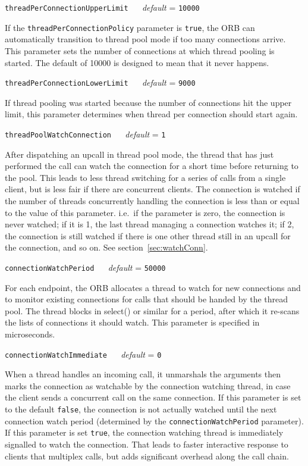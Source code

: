 \documentclass[11pt,twoside,a4paper]{book}
\makeatletter
\newcommand{\code}[1]{\texttt{#1}}
\newcommand{\confopt}[2]
  {\vspace{\baselineskip}\par\noindent\code{#1} ~~ \textit{default} =
   \code{#2}}
\renewcommand{\confopt}[2]
  {\vspace{\baselineskip}\par\noindent\code{#1} ~~ \textit{default} =
   \code{#2}\\[-1ex]\@afterheading}
\makeatother
\begin{document}
\confopt{threadPerConnectionUpperLimit}{10000}

If the \code{threadPerConnectionPolicy} parameter is \code{true}, the
ORB can automatically transition to thread pool mode if too many
connections arrive. This parameter sets the number of connections at
which thread pooling is started. The default of 10000 is designed to
mean that it never happens.


\confopt{threadPerConnectionLowerLimit}{9000}

If thread pooling was started because the number of connections hit
the upper limit, this parameter determines when thread per connection
should start again.


\confopt{threadPoolWatchConnection}{1}

After dispatching an upcall in thread pool mode, the thread that has
just performed the call can watch the connection for a short time
before returning to the pool. This leads to less thread switching for
a series of calls from a single client, but is less fair if there are
concurrent clients. The connection is watched if the number of threads
concurrently handling the connection is less than or equal to the
value of this parameter. i.e.\ if the parameter is zero, the
connection is never watched; if it is 1, the last thread managing a
connection watches it; if 2, the connection is still watched if there
is one other thread still in an upcall for the connection, and so
on. See section~\ref{sec:watchConn}.


\confopt{connectionWatchPeriod}{50000}

For each endpoint, the ORB allocates a thread to watch for new
connections and to monitor existing connections for calls that should
be handed by the thread pool. The thread blocks in select() or similar
for a period, after which it re-scans the lists of connections it
should watch. This parameter is specified in microseconds.


\confopt{connectionWatchImmediate}{0}

When a thread handles an incoming call, it unmarshals the arguments
then marks the connection as watchable by the connection watching
thread, in case the client sends a concurrent call on the same
connection. If this parameter is set to the default \code{false}, the
connection is not actually watched until the next connection watch
period (determined by the \code{connectionWatchPeriod} parameter).  If
this parameter is set \code{true}, the connection watching thread is
immediately signalled to watch the connection. That leads to faster
interactive response to clients that multiplex calls, but adds
significant overhead along the call chain.
\end{document}
